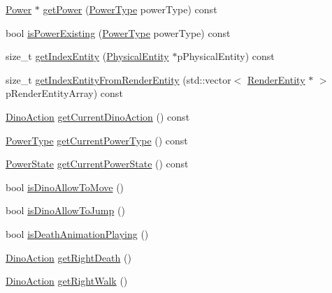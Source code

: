 \begin{DoxyCompactItemize}
\item 
\hyperlink{class_symp_1_1_power}{Power} $\ast$ \hyperlink{class_symp_1_1_entity_manager_a56a75c8ac95c235d4740d61315c841c5}{get\-Power} (\hyperlink{namespace_symp_a81b2b15da470e4ace7de6835ebe0f8ba}{Power\-Type} power\-Type) const 
\item 
bool \hyperlink{class_symp_1_1_entity_manager_a49fa79a733f9a075807cacd69b5b8e75}{is\-Power\-Existing} (\hyperlink{namespace_symp_a81b2b15da470e4ace7de6835ebe0f8ba}{Power\-Type} power\-Type) const 
\item 
size\-\_\-t \hyperlink{class_symp_1_1_entity_manager_a9009e9467ce9240176f37041531f1f53}{get\-Index\-Entity} (\hyperlink{class_symp_1_1_physical_entity}{Physical\-Entity} $\ast$p\-Physical\-Entity) const 
\item 
size\-\_\-t \hyperlink{class_symp_1_1_entity_manager_a120b298f2703eef7973e123a67c9bcdd}{get\-Index\-Entity\-From\-Render\-Entity} (std\-::vector$<$ \hyperlink{class_symp_1_1_render_entity}{Render\-Entity} $\ast$ $>$ p\-Render\-Entity\-Array) const 
\item 
\hyperlink{namespace_symp_a303925db810fa122d017c4001bfa5e88}{Dino\-Action} \hyperlink{class_symp_1_1_entity_manager_af68a927c11f97d6bedb3e4f1d24b7113}{get\-Current\-Dino\-Action} () const 
\item 
\hyperlink{namespace_symp_a81b2b15da470e4ace7de6835ebe0f8ba}{Power\-Type} \hyperlink{class_symp_1_1_entity_manager_a3d3c399d4194f5c08371b8fa182b11c9}{get\-Current\-Power\-Type} () const 
\item 
\hyperlink{namespace_symp_a7c4a93cb3761077f6b73ebce19c562c1}{Power\-State} \hyperlink{class_symp_1_1_entity_manager_a0649f2b3f065f7ffd9457b3401b78146}{get\-Current\-Power\-State} () const 
\item 
bool \hyperlink{class_symp_1_1_entity_manager_a78c7feee11012871c2e0bf11f9c7f9d3}{is\-Dino\-Allow\-To\-Move} ()
\item 
bool \hyperlink{class_symp_1_1_entity_manager_a530f46316832cbe3f39278a80b41a0de}{is\-Dino\-Allow\-To\-Jump} ()
\item 
bool \hyperlink{class_symp_1_1_entity_manager_a5b5a53c52b7f2133e74f910320ee3203}{is\-Death\-Animation\-Playing} ()
\item 
\hyperlink{namespace_symp_a303925db810fa122d017c4001bfa5e88}{Dino\-Action} \hyperlink{class_symp_1_1_entity_manager_a7c72832895e29e4eb5f77d6ab0fe58d2}{get\-Right\-Death} ()
\item 
\hyperlink{namespace_symp_a303925db810fa122d017c4001bfa5e88}{Dino\-Action} \hyperlink{class_symp_1_1_entity_manager_a3ce38be311a9d0712d3b8713eb5f76e8}{get\-Right\-Walk} ()

\end{DoxyCompactItemize}
